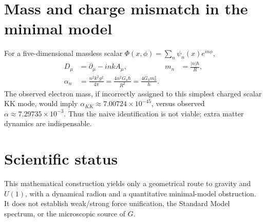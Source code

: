 \documentclass[11pt]{article}
\begin{document}
\section{Mass and charge mismatch in the minimal model}
For a five-dimensional massless scalar $\Phi(x,\phi)=\sum_n\psi_n(x)e^{in\phi}$,
\begin{align}
D_\mu&=\partial_\mu-in kA_\mu,&m_n&=\frac{|n|\hbar}{R},\\
\alpha_n&=\frac{n^2k^2g^2}{4\pi}=\frac{4n^2G_4\hbar}{R^2}=\boxed{\frac{4G_4 m_n^2}{\hbar}}.
\end{align}
The observed electron mass, if incorrectly assigned to this simplest charged scalar KK mode, would imply $\alpha_{KK}\approx7.00724\times10^{-45}$, versus observed $\alpha\approx7.29735\times10^{-3}$. Thus the naive identification is not viable; extra matter dynamics are indispensable.
\section{Scientific status}
This mathematical construction yields only a geometrical route to gravity and $U(1)$, with a dynamical radion and a quantitative minimal-model obstruction. It does not establish weak/strong force unification, the Standard Model spectrum, or the microscopic source of $G$.
\end{document}
